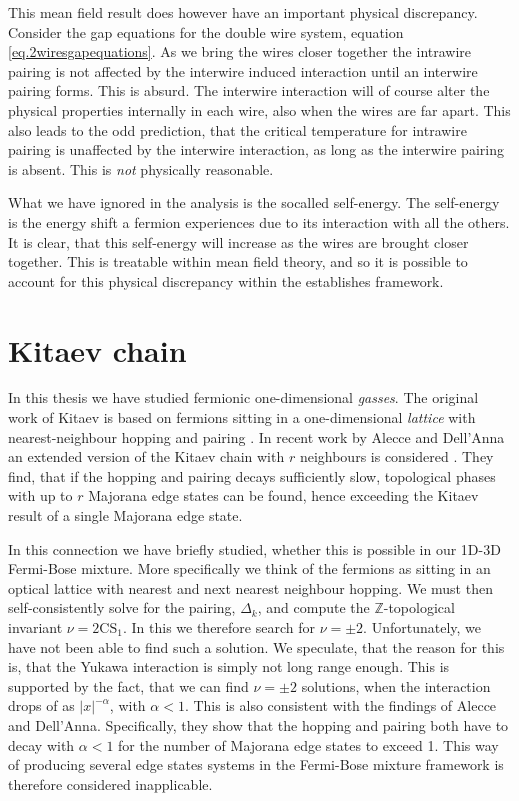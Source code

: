 This mean field result does however have an important physical discrepancy. Consider the gap equations for the double wire system, equation \eqref{eq.2wiresgapequations}. As we bring the wires closer together the intrawire pairing is not affected by the interwire induced interaction until an interwire pairing forms. This is absurd. The interwire interaction will of course alter the physical properties internally in each wire, also when the wires are far apart. This also leads to the odd prediction, that the critical temperature for intrawire pairing is unaffected by the interwire interaction, as long as the interwire pairing is absent. This is \textit{not} physically reasonable. 

What we have ignored in the analysis is the socalled self-energy. The self-energy is the energy shift a fermion experiences due to its interaction with all the others. It is clear, that this self-energy will increase as the wires are brought closer together. This is treatable within mean field theory, and so it is possible to account for this physical discrepancy within the establishes framework. 

\section{Kitaev chain} \label{sec.Discussion.KitaevChain}
In this thesis we have studied fermionic one-dimensional \textit{gasses}. The original work of Kitaev is based on fermions sitting in a one-dimensional \textit{lattice} with nearest-neighbour hopping and pairing \cite{KitaevQuantumWires}. In recent work by Alecce and Dell'Anna an extended version of the Kitaev chain with $r$ neighbours is considered \cite{Alecce.extendKitaev}. They find, that if the hopping and pairing decays sufficiently slow, topological phases with up to $r$ Majorana edge states can be found, hence exceeding the Kitaev result of a single Majorana edge state. 

In this connection we have briefly studied, whether this is possible in our 1D-3D Fermi-Bose mixture. More specifically we think of the fermions as sitting in an optical lattice with nearest and next nearest neighbour hopping. We must then self-consistently solve for the pairing, $\Delta_k$, and compute the $\mathbb{Z}$-topological invariant $\nu = 2\text{CS}_1$. In this we therefore search for $\nu = \pm 2$. Unfortunately, we have not been able to find such a solution. We speculate, that the reason for this is, that the Yukawa interaction is simply not long range enough. This is supported by the fact, that we can find $\nu = \pm 2$ solutions, when the interaction drops of as $|x|^{-\alpha}$, with $\alpha < 1$. This is also consistent with the findings of Alecce and Dell'Anna. Specifically, they show that the hopping and pairing both have to decay with $\alpha < 1$ for the number of Majorana edge states to exceed 1. This way of producing several edge states systems in the Fermi-Bose mixture framework is therefore considered inapplicable. 

